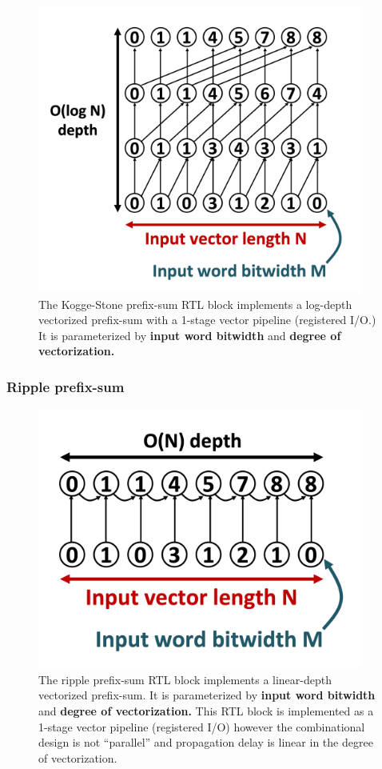 \begin{figure}[H]
    \centering
    \includegraphics[width=0.95\textwidth]{figures/kogge_stone_prefix_sum.png}
    \caption{The Kogge-Stone\cite{koggestone} prefix-sum RTL block implements a log-depth vectorized prefix-sum with a 1-stage vector pipeline (registered I/O.) It is parameterized by \textbf{input word bitwidth} and \textbf{degree of vectorization.}}
    \label{fig:kogge_stone_prefix_sum}
\end{figure}

\subsubsection{Ripple prefix-sum}


\begin{figure}[H]
    \centering
    \includegraphics[width=0.95\textwidth]{figures/ripple_prefix_sum.png}
    \caption{The ripple prefix-sum RTL block implements a linear-depth vectorized prefix-sum. It is parameterized by \textbf{input word bitwidth} and \textbf{degree of vectorization.} This RTL block is implemented as a 1-stage vector pipeline (registered I/O) however the combinational design is not ``parallel'' and propagation delay is linear in the degree of vectorization.}
    \label{fig:ripple_prefix_sum}
\end{figure}
